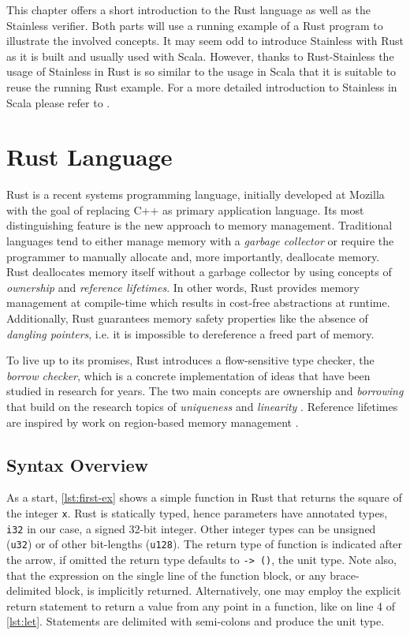 This chapter offers a short introduction to the Rust language as well as the
Stainless verifier. Both parts will use a running example of a Rust program to
illustrate the involved concepts. It may seem odd to introduce Stainless with
Rust  as it is built and usually used with Scala. However, thanks to
Rust-Stainless the  usage of Stainless in Rust is so similar to the usage in
Scala that it is suitable  to reuse the running Rust example. For a more
detailed introduction to Stainless in Scala please refer to
\cite{stainless-doc}.

\section{Rust Language}

Rust \cite{rust2, rust1} is a recent systems programming language, initially
developed at Mozilla with the goal of replacing C++ as primary application
language. Its most distinguishing feature is the new approach to memory
management. Traditional languages tend to either manage memory with a
\emph{garbage collector} or require the programmer to manually allocate and,
more importantly, deallocate memory. Rust deallocates memory itself without a
garbage collector by using concepts of \emph{ownership} and \emph{reference
lifetimes}. In other words, Rust provides memory management at compile-time
which results in cost-free abstractions at runtime. Additionally, Rust
guarantees memory safety properties like  the absence of \emph{dangling
pointers}, i.e. it is impossible to dereference a freed part of memory.

To live up to its promises, Rust introduces a flow-sensitive type checker, the
\emph{borrow checker}, which is a concrete implementation of ideas that have
been studied in research for years. The two main concepts are ownership
\cite{ownership-types} and \emph{borrowing} that build on the research topics of
\emph{uniqueness} \cite{alias-burying} and \emph{linearity}
\cite{Wadler90lineartypes, once-upon-a-type}. Reference lifetimes are inspired
by work on region-based memory management \cite{cyclone-region}.


\subsection{Syntax Overview}

As a start, \autoref{lst:first-ex} shows a simple function in Rust that returns
the square of the integer \lstinline!x!. Rust is statically typed, hence
parameters have annotated types, \lstinline!i32! in our case, a signed 32-bit
integer. Other integer types can be unsigned (\lstinline!u32!) or of other
bit-lengths (\lstinline!u128!). The return type of function is indicated after
the arrow, if omitted the return type defaults to \lstinline!-> ()!, the unit
type. Note also, that the expression on the single line of the function block,
or any brace-delimited block, is implicitly returned. Alternatively, one may
employ the explicit return statement to return a value from any point in a
function, like on line 4 of \autoref{lst:let}. Statements are delimited with
semi-colons and produce the unit type.

